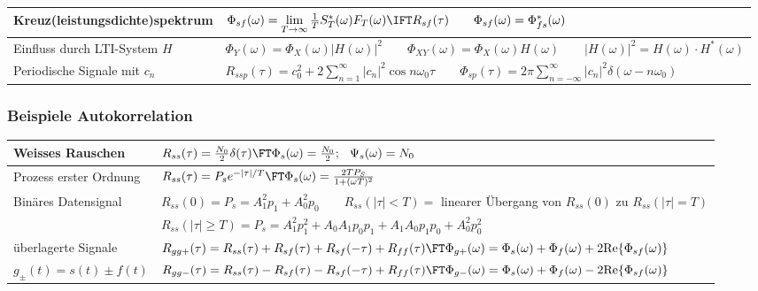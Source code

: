 \begin{tabular}{|l|l|}
    \hline
    Kreuz(leistungsdichte)spektrum 
        & $\Phi_{sf}(\omega) = \lim\limits_{T \rightarrow \infty} \frac 1T  S_T^*(\omega) F_T(\omega) \IFT R_{sf}(\tau) \qquad \Phi_{sf}(\omega) = \Phi_{fs}^*(\omega)$ \\
    \hline
    Einfluss durch LTI-System $H$
        & $ \Phi_{Y}(\omega) = \Phi_{X}(\omega) \left|H(\omega)\right|^2 
        \qquad
            \Phi_{XY}(\omega) = \Phi_{X}(\omega) H(\omega) 
        \qquad 
             |H(\omega)|^2 = H(\omega)\cdot H^*(\omega)$ \\
    \hline
    Periodische Signale mit $c_n$
        & $R_{ssp}(\tau) = c_0^2 + 2 \sum\limits_{n=1}^{\infty} |c_n|^2 \cos n \omega_0 \tau  \qquad
        \Phi_{sp}(\tau) = 2 \pi \sum\limits_{n=-\infty}^{\infty} |c_n|^2 \delta (\omega - n \omega_0)   $\\
    \hline
\end{tabular}
\vspace{-0.5cm}
\subsubsection{Beispiele Autokorrelation}
\begin{tabular}{|l|l|}
    \hline
        Weisses Rauschen
        & $R_{ss} (\tau) = \frac {N_0}{2} \delta(\tau) \FT \Phi_s(\omega)= \frac {N_0}{2};\hspace{0.25cm} \Psi_s(\omega) = N_0$\\
    \hline
        Prozess erster Ordnung
        & $R_{ss} (\tau) = P_s e^{-|\tau|/T} \FT \Phi_s (\omega) = \frac {2 T P_S}{1 + (\omega T)^2}$\\
    \hline
        Binäres Datensignal
        & $R_{ss} (0) = P_s = A_1^2p_1 + A_0^2 p_0 \qquad R_{ss} (|\tau| < T) = $ linearer Übergang von $R_{ss}(0)$ zu $R_{ss} (|\tau| = T)$ \\
        & $R_{ss} (|\tau| \geq T) = P_s = A_1^2p_1^2 + A_0A_1p_0p_1 + A_1A_0p_1p_0 + A_0^2p_0^2$  \\
    \hline
        überlagerte Signale
        & $R_{gg+}(\tau) = R_{ss}(\tau) + R_{sf}(\tau) + R_{sf}(-\tau) + R_{ff}(\tau)
        \FT \Phi_{g+}(\omega) = \Phi_{s}(\omega) + \Phi_{f}(\omega) + 2 \text{Re} \{ \Phi_{sf}(\omega) \}$
        \\ $g_\pm(t) = s(t) \pm f(t)$
        & $R_{gg-}(\tau) = R_{ss}(\tau) - R_{sf}(\tau) - R_{sf}(-\tau) + R_{ff}(\tau)
            \FT \Phi_{g-}(\omega) = \Phi_{s}(\omega) + \Phi_{f}(\omega) - 2 \text{Re} \{ \Phi_{sf}(\omega) \}$
        \\
    \hline
\end{tabular} 
\vspace{-0.5cm}
